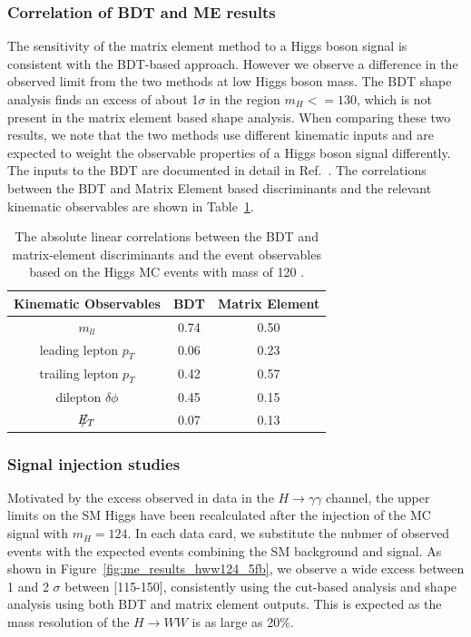 \subsubsection{Correlation of BDT and ME results}
\label{sec:mebdt_correlations}

The sensitivity of the matrix element method to a Higgs boson signal
is consistent with the BDT-based approach.
However we observe a difference in the observed limit from the two methods
 at low Higgs boson mass.     
The BDT shape analysis finds an excess of about 1$\sigma$ in the region $m_H<=130$\GeV,
which is not present in the matrix element based shape analysis.
When comparing these two results, we note that the two methods use different kinematic
inputs and are expected to weight the observable properties of a Higgs boson signal differently.
The inputs to the BDT are documented in detail in Ref.~\cite{ref:HWW2011smurf}.
The correlations between the BDT and Matrix Element based discriminants and the
relevant kinematic observables are shown in Table~\ref{tab:bdt_me_corr}.


\begin{table}[!htbp]
\begin{center}
\begin{tabular}{c c c}
\hline
Kinematic Observables & BDT & Matrix Element \\
\hline
$m_{ll}$ & 0.74 & 0.50 \\
leading lepton $p_T$ & 0.06 & 0.23 \\
trailing lepton $p_T$ & 0.42 & 0.57 \\
dilepton $\delta\phi$ & 0.45 & 0.15 \\
$\mbox{$E_T\hspace{-1.1em}/$\hspace{0.7em}}$  & 0.07 & 0.13 \\
\hline
\end{tabular}
\end{center}
\label{tab:bdt_me_corr}
\caption{The absolute linear correlations between the BDT and matrix-element discriminants and the
event observables based on the Higgs MC events with mass of 120 \GeV. }
\end{table}

\subsubsection{Signal injection studies}

Motivated by the excess observed in data in the $H\to\gamma\gamma$ channel, the upper limits on the SM Higgs have been 
recalculated after the injection of the MC signal with 
$m_H=124$\GeV. In each data card, we substitute the nubmer of 
observed events with the expected events combining the SM 
background and signal. As shown in Figure~\ref{fig:me_results_hww124_5fb}, 
we observe a wide excess between 1 and 2 $\sigma$ between [115-150]\GeV, consistently 
using the cut-based analysis and shape analysis using both BDT and 
matrix element outputs. This is expected as the mass resolution of the 
$H\to WW$ is as large as 20\%. 

